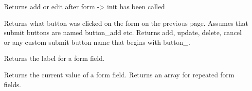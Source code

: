 \documentclass[letterpaper,10pt,english]{sphinxmanual}
\begin{document}
\begin{fulllineitems}
\begin{fulllineitems}
\end{fulllineitems}


\begin{fulllineitems}
\label{knop_form:knop_form.formmode}
Returns add or edit after form -\textgreater{} init has been called

\end{fulllineitems}



\begin{fulllineitems}
\end{fulllineitems}


\begin{fulllineitems}
\label{knop_form:knop_form.getbutton}
Returns what button was clicked on the form on the previous page. Assumes that submit buttons are named button\_add etc.
Returns add, update, delete, cancel or any custom submit button name that begins with button\_.

\end{fulllineitems}


\begin{fulllineitems}
\label{knop_form:knop_form.getlabel}
Returns the label for a form field.

\end{fulllineitems}


\begin{fulllineitems}
\label{knop_form:knop_form.getvalue}
\end{fulllineitems}


\begin{fulllineitems}
Returns the current value of a form field. Returns an array for repeated form fields.


\end{fulllineitems}
\end{fulllineitems}
\end{document}
